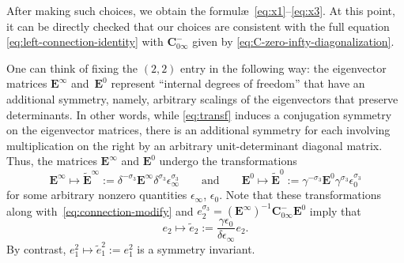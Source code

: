 After making such choices, we obtain the formul\ae\ \eqref{eq:x1}--\eqref{eq:x3}. At this point, it can be directly checked that our choices are consistent with the full equation \eqref{eq:left-connection-identity} with $\mathbf C_{0\infty}^-$ given by \eqref{eq:C-zero-infty-diagonalization}.

One can think of fixing the $(2,2)$ entry in the following way: the eigenvector matrices $\mathbf{E}^\infty$ and~$\mathbf{E}^0$ represent ``internal degrees of freedom'' that have an additional symmetry, namely, arbitrary scalings of the eigenvectors that preserve determinants. In other words, while \eqref{eq:transf} induces a conjugation symmetry on the eigenvector matrices, there is an additional symmetry for each involving multiplication on the right by an arbitrary unit-determinant diagonal matrix. Thus, the matrices $\mathbf{E}^\infty$ and $\mathbf{E}^0$ undergo the transformations
 \begin{equation*}
 \mathbf{E}^{\infty}\mapsto \widetilde{\mathbf{E}}^\infty:=\delta^{-\sigma_3}\mathbf{E}^\infty\delta^{\sigma_3}\epsilon_\infty^{\sigma_3}\qquad\text{and}\qquad
 \mathbf{E}^{0}\mapsto \widetilde{\mathbf{E}}^0:=\gamma^{-\sigma_3}\mathbf{E}^0\gamma^{\sigma_3}\epsilon_0^{\sigma_3}
 \end{equation*}
 for some arbitrary nonzero quantities $\epsilon_\infty$, $\epsilon_0$. Note that these transformations along with~\eqref{eq:connection-modify} and $e_2^{\sigma_3}=(\mathbf{E}^\infty)^{-1}\mathbf{C}_{0\infty}^-\mathbf{E}^0$ imply that
 \begin{equation*}
 e_2\mapsto\widetilde{e}_2:=\frac{\gamma\epsilon_0}{\delta\epsilon_\infty}e_2.
 \end{equation*}
 By contrast, $e_1^2\mapsto\widetilde{e}_1^2:=e_1^2$ is a symmetry invariant.

